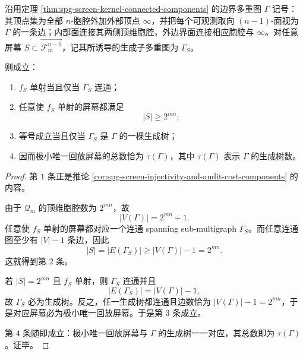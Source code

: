 \begin{theorem}[唯一回放屏幕的极小规模与生成树刻画]\label{thm:xi-time-part65f-exact-screen-spanning-tree-threshold}
沿用定理 \ref{thm:spg-screen-kernel-connected-components} 的边界多重图 \(\Gamma\) 记号：其顶点集为全部 \(n\)-胞腔外加外部顶点 \(\infty\)，并把每个可观测取向 \((n-1)\)-面视为 \(\Gamma\) 的一条边；内部面连接其两侧顶维胞腔，外边界面连接相应胞腔与 \(\infty\)。对任意屏幕 \(S\subset \overrightarrow{\mathcal F_m^{n-1}}\)，记其所诱导的生成子多重图为 \(\Gamma_S\)。

则成立：
\begin{enumerate}
  \item \(f_S\) 单射当且仅当 \(\Gamma_S\) 连通；
  \item 任意使 \(f_S\) 单射的屏幕都满足
        \[
        |S|\ge 2^{mn};
        \]
  \item 等号成立当且仅当 \(\Gamma_S\) 是 \(\Gamma\) 的一棵生成树；
  \item 因而极小唯一回放屏幕的总数恰为 \(\tau(\Gamma)\)，其中 \(\tau(\Gamma)\) 表示 \(\Gamma\) 的生成树数。
\end{enumerate}
\end{theorem}
\begin{proof}
第 \(1\) 条正是推论 \ref{cor:spg-screen-injectivity-and-audit-cost-components} 的内容。

由于 \(\mathcal Q_m\) 的顶维胞腔数为 \(2^{mn}\)，故
\[
|V(\Gamma)|=2^{mn}+1.
\]
任意使 \(f_S\) 单射的屏幕都对应一个连通 spanning sub-multigraph \(\Gamma_S\)。而任意连通图至少有 \(|V|-1\) 条边，因此
\[
|S|=|E(\Gamma_S)|\ge |V(\Gamma)|-1=2^{mn}.
\]
这就得到第 \(2\) 条。

若 \(|S|=2^{mn}\) 且 \(f_S\) 单射，则 \(\Gamma_S\) 连通并且
\[
|E(\Gamma_S)|=|V(\Gamma)|-1,
\]
故 \(\Gamma_S\) 必为生成树。反之，任一生成树都连通且边数恰为 \(|V(\Gamma)|-1=2^{mn}\)，于是对应屏幕必为极小唯一回放屏幕。于是第 \(3\) 条成立。

第 \(4\) 条随即成立：极小唯一回放屏幕与 \(\Gamma\) 的生成树一一对应，其总数即为 \(\tau(\Gamma)\)。证毕。
\end{proof}

